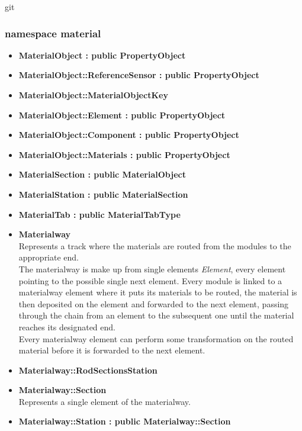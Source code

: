 git\documentclass[12pt, a4paper]{article}
\begin{document}
\subsubsection{namespace material}

\begin{itemize}

\item \textbf{MaterialObject : public PropertyObject}
\item \textbf{MaterialObject::ReferenceSensor : public PropertyObject}
\item \textbf{MaterialObject::MaterialObjectKey}
\item \textbf{MaterialObject::Element : public PropertyObject}
\item \textbf{MaterialObject::Component : public PropertyObject}
\item \textbf{MaterialObject::Materials : public PropertyObject}
\item \textbf{MaterialSection : public MaterialObject}
\item \textbf{MaterialStation : public MaterialSection}
\item \textbf{MaterialTab : public MaterialTabType}

\item \textbf{Materialway}\\
Represents a track where the materials are routed from the modules to the appropriate end.\\ 
The materialway is make up from single elements \emph{Element}, every element pointing to the possible single next element. Every module is linked to a materialway element where it puts its materials to be routed, the material is then deposited on the element and forwarded to the next element, passing through the chain from an element to the subsequent one until the material reaches its designated end.\\ 
Every materialway element can perform some transformation on the routed material before it is forwarded to the next element.

\item \textbf{Materialway::RodSectionsStation}

\item \textbf{Materialway::Section}\\
Represents a single element of the materialway.

\item \textbf{Materialway::Station : public Materialway::Section}


\end{itemize}
\end{document}
